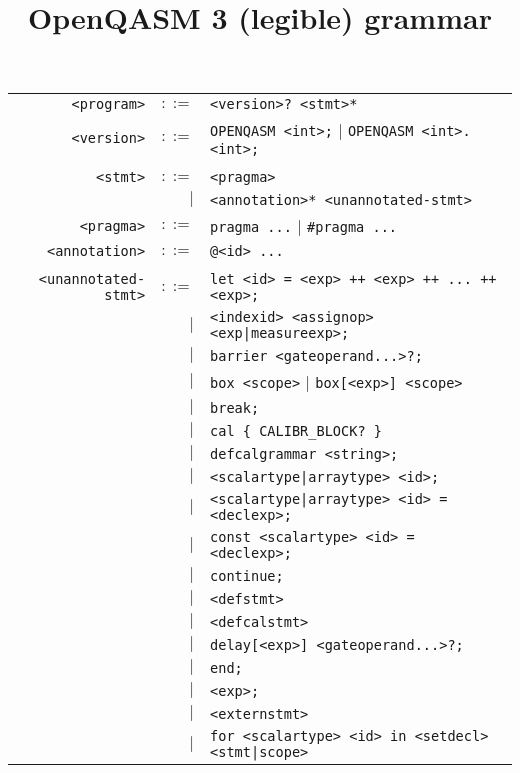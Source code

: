 \documentclass[notitlepage]{article}
\title{OpenQASM 3 (legible) grammar}
\date{\vspace{-10ex}}
\begin{document}
\maketitle

\begin{longtable}{rrl}
	\texttt{<program>} & $::=$ & \texttt{<version>? <stmt>*} \\
	\texttt{<version>} & $::=$ & \texttt{OPENQASM <int>;} $\mid$ \texttt{OPENQASM <int>.<int>;} \\ \\
	\texttt{<stmt>} & $::=$ & \texttt{<pragma>} \\
	    & $\mid$ & \texttt{<annotation>* <unannotated-stmt>} \\
	\texttt{<pragma>} & $::=$ & \texttt{pragma ...} $\mid$ \texttt{\#pragma ...} \\
	\texttt{<annotation>} & $::=$ & \texttt{@<id> ...} \\ \\
	\texttt{<unannotated-stmt>} & $::=$ & \texttt{let <id> = <exp> ++ <exp> ++ ... ++ <exp>;} \\
	    & $\mid$ & \texttt{<indexid> <assignop> <exp|measureexp>;} \\
	    & $\mid$ & \texttt{barrier <gateoperand...>?;} \\
	    & $\mid$ & \texttt{box <scope>} $\mid$ \texttt{box[<exp>] <scope>} \\
	    & $\mid$ & \texttt{break;} \\
	    & $\mid$ & \texttt{cal \{ CALIBR\_BLOCK? \}} \\
	    & $\mid$ & \texttt{defcalgrammar <string>;} \\
	    & $\mid$ & \texttt{<scalartype|arraytype> <id>;} \\
	    & $\mid$ & \texttt{<scalartype|arraytype> <id> = <declexp>;} \\
	    & $\mid$ & \texttt{const <scalartype> <id> = <declexp>;} \\
	    & $\mid$ & \texttt{continue;} \\
	    & $\mid$ & \texttt{<defstmt>} \\
	    & $\mid$ & \texttt{<defcalstmt>} \\
	    & $\mid$ & \texttt{delay[<exp>] <gateoperand...>?;} \\
	    & $\mid$ & \texttt{end;} \\
	    & $\mid$ & \texttt{<exp>;} \\
	    & $\mid$ & \texttt{<externstmt>} \\
	    & $\mid$ & \texttt{for <scalartype> <id> in <setdecl> <stmt|scope>} \\

\end{longtable}
\end{document}
